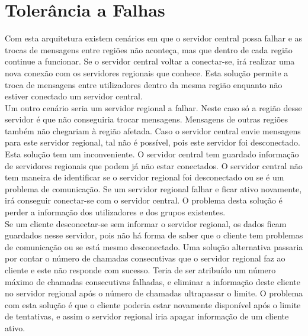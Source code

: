 \chapter{Tolerância a Falhas}

Com esta arquitetura existem cenários em que o servidor central possa falhar e as trocas de mensagens entre regiões não aconteça, mas que dentro de cada região continue a funcionar. Se o servidor central voltar a conectar-se, irá realizar uma nova conexão com os servidores regionais que conhece. Esta solução permite a troca de mensagens entre utilizadores dentro da mesma região enquanto não estiver conectado um servidor central.\\

Um outro cenário seria um servidor regional a falhar. Neste caso só a região desse servidor é que não conseguiria trocar mensagens. Mensagens de outras regiões também não chegariam à região afetada. Caso o servidor central envie mensagens para este servidor regional, tal não é possível, pois este servidor foi desconectado. Esta solução tem um inconveniente. O servidor central tem guardado informação de servidores regionais que podem já não estar conectados. O servidor central não tem maneira de identificar se o servidor regional foi desconectado ou se é um problema de comunicação. Se um servidor regional falhar e ficar ativo novamente, irá conseguir conectar-se com o servidor central. O problema desta solução é perder a informação dos utilizadores e dos grupos existentes.\\

Se um cliente desconectar-se sem informar o servidor regional, os dados ficam guardados nesse servidor, pois não há forma de saber que o cliente tem problemas de comunicação ou se está mesmo desconectado. 
Uma solução alternativa passaria por contar o número de chamadas consecutivas que o servidor regional faz ao cliente e este não responde com sucesso. Teria de ser atribuído um número máximo de chamadas consecutivas falhadas, e eliminar a informação deste cliente no servidor regional após o número de chamadas ultrapassar o limite. O problema com esta solução é que o cliente poderia estar novamente disponível após o limite de tentativas, e assim o servidor regional iria apagar informação de um cliente ativo.